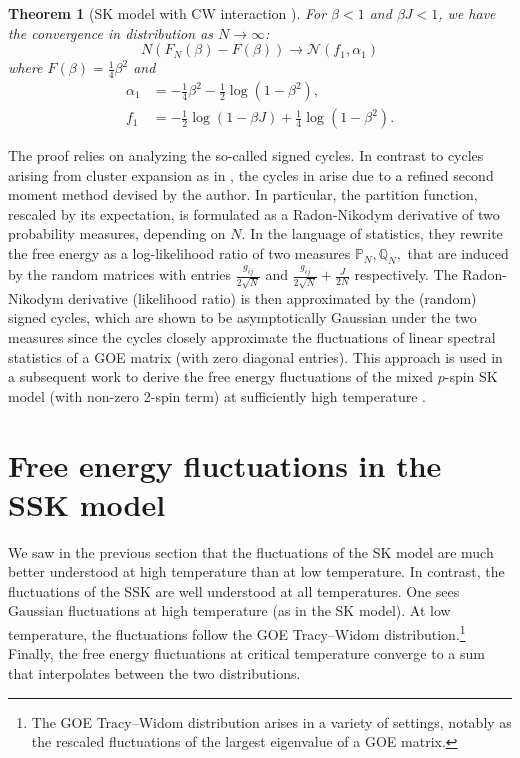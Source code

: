 \documentclass[11pt]{article}
\numberwithin{equation}{section}
\def \a {\alpha}
\def \b {\beta}
\def \cN {\mathcal{N}}
\newtheorem{theorem}{Theorem}[section]
\theoremstyle{remark}
\begin{document}
\begin{theorem}[SK model with CW interaction ]
        For $\b<1$ and $\b J <1$, we have the convergence in distribution as $N \to \infty$:
        \[
        N(F_N(\b) -F(\b)) \to \cN(f_1,\a_1)
        \]
        where $F(\b)=\frac14\b^2$ and
        \begin{align*}
            \a_1 &= -\frac14\b^2 - \frac12 \log(1-\b^2),\\
            f_1 &= -\frac12\log(1-\b J) + \frac14\log(1-\b^2).
        \end{align*}
    \end{theorem}
The proof relies on analyzing the so-called signed cycles. In contrast to cycles arising from cluster expansion as in \cites{AizenmanLebowitzRuelle, DeyWu23}, the cycles in \cite{Banerjee2020} arise due to a refined second moment method devised by the author. In particular, the partition function, rescaled by its expectation, is formulated as a Radon-Nikodym derivative of two probability measures, depending on $N$. In the language of statistics, they rewrite the free energy as a log-likelihood ratio of two measures $\mathbb{P}_N,\mathbb{Q}_N,$ that are induced by the random matrices with entries $\frac{g_{ij}}{2\sqrt{N}}$ and $\frac{g_{ij}}{2\sqrt{N}}+\frac{J}{2N}$ respectively. The Radon-Nikodym derivative (likelihood ratio) is then approximated by the (random) signed cycles, which are shown to be asymptotically Gaussian under the two measures since the cycles closely approximate the fluctuations of linear spectral statistics of a GOE matrix (with zero diagonal entries). This approach is used in a subsequent work to derive the free energy fluctuations of the mixed $p$-spin SK model (with non-zero 2-spin term) at sufficiently high temperature \cite{Banerjee2021}.

\section{Free energy fluctuations in the SSK model}\label{sec:SSK}

We saw in the previous section that the fluctuations of the SK model are much better understood at high temperature than at low temperature.  In contrast, the fluctuations of the SSK are well understood at all temperatures.  One sees Gaussian fluctuations at high temperature (as in the SK model). At low temperature, the fluctuations follow the GOE Tracy--Widom distribution.\footnote{The GOE Tracy--Widom distribution arises in a variety of settings, notably as the rescaled fluctuations of the largest eigenvalue of a GOE matrix.} Finally, the free energy fluctuations at critical temperature converge to a sum that interpolates between the two distributions.  
\end{document}
